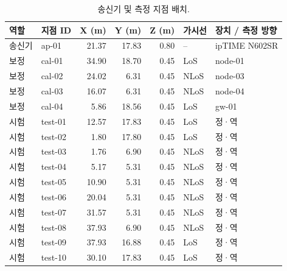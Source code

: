 \documentclass[11pt,a4paper]{article}
\begin{document}
\begin{table}[htbp]
  \centering\small
  \caption{송신기 및 측정 지점 배치.}
  \label{tab:a1}
  \begin{tabular}{@{}llrrrll@{}}
    \toprule
    역할 & 지점 ID & X (m) & Y (m) & Z (m) & 가시선 & 장치 / 측정 방향 \\
    \midrule
    송신기 & ap-01   & 21.37 & 17.83 & 0.80 & --   & ipTIME N602SR \\
    보정   & cal-01  & 34.90 & 18.70 & 0.45 & LoS  & node-01 \\
    보정   & cal-02  & 24.02 & 6.31  & 0.45 & NLoS & node-03 \\
    보정   & cal-03  & 16.07 & 6.31  & 0.45 & NLoS & node-04 \\
    보정   & cal-04  & 5.86  & 18.56 & 0.45 & LoS  & gw-01 \\
    시험   & test-01 & 12.57 & 17.83 & 0.45 & LoS  & 정·역 \\
    시험   & test-02 & 1.80  & 17.80 & 0.45 & LoS  & 정·역 \\
    시험   & test-03 & 1.76  & 6.90  & 0.45 & NLoS & 정·역 \\
    시험   & test-04 & 5.17  & 5.31  & 0.45 & NLoS & 정·역 \\
    시험   & test-05 & 10.90 & 5.31  & 0.45 & NLoS & 정·역 \\
    시험   & test-06 & 20.04 & 5.31  & 0.45 & NLoS & 정·역 \\
    시험   & test-07 & 31.57 & 5.31  & 0.45 & NLoS & 정·역 \\
    시험   & test-08 & 37.93 & 6.90  & 0.45 & NLoS & 정·역 \\
    시험   & test-09 & 37.93 & 16.88 & 0.45 & LoS  & 정·역 \\
    시험   & test-10 & 30.10 & 17.83 & 0.45 & LoS  & 정·역 \\
    \bottomrule
  \end{tabular}
\end{table}
\end{document}
